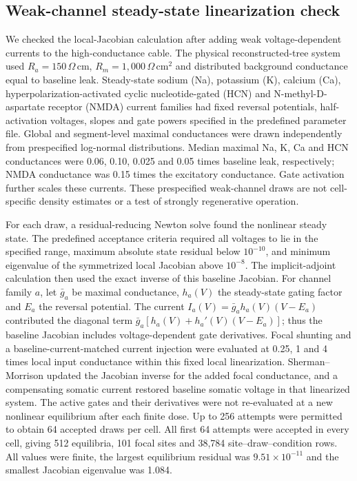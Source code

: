 \subsection{Weak-channel steady-state linearization check}

We checked the local-Jacobian calculation after adding weak
voltage-dependent currents to the high-conductance cable.
The physical reconstructed-tree system used
$R_a=150\,\Omega\,\mathrm{cm}$,
$R_m=1{,}000\,\Omega\,\mathrm{cm}^2$ and distributed background conductance
equal to baseline leak. Steady-state sodium (Na), potassium (K), calcium (Ca),
hyperpolarization-activated cyclic nucleotide-gated (HCN) and
N-methyl-D-aspartate receptor (NMDA) current families had fixed reversal
potentials, half-activation voltages, slopes and gate
powers specified in the predefined parameter file. Global and segment-level
maximal conductances were drawn independently from prespecified log-normal
distributions. Median maximal Na, K, Ca and HCN conductances were 0.06,
0.10, 0.025 and 0.05 times baseline leak, respectively; NMDA conductance was
0.15 times the excitatory conductance. Gate activation further scales these
currents. These prespecified weak-channel draws are not cell-specific
density estimates or a test of strongly regenerative operation.

For each draw, a residual-reducing Newton solve found the nonlinear steady
state. The predefined acceptance criteria required all voltages to lie in the
specified range, maximum absolute state residual below $10^{-10}$, and minimum
eigenvalue of the symmetrized local Jacobian above $10^{-8}$. The implicit-adjoint calculation
then used the exact inverse of this baseline Jacobian. For channel family $a$, let $\bar g_a$ be maximal conductance, $h_a(V)$ the
steady-state gating factor and $E_a$ the reversal potential. The current
$I_a(V)=\bar g_a h_a(V)(V-E_a)$ contributed the diagonal term
$\bar g_a[h_a(V)+h_a'(V)(V-E_a)]$; thus the baseline Jacobian includes
voltage-dependent gate derivatives. Focal shunting and a
baseline-current-matched current injection were evaluated at 0.25, 1 and 4
times local input conductance within this fixed local linearization.
Sherman--Morrison updated the Jacobian inverse for the added focal
conductance, and a compensating somatic current restored baseline somatic
voltage in that linearized system. The active gates and their derivatives
were not re-evaluated at a new nonlinear equilibrium after each finite dose.
Up to 256 attempts were permitted to obtain 64
accepted draws per cell. All first 64 attempts were accepted in every cell,
giving 512 equilibria, 101 focal sites and 38,784 site--draw--condition rows.
All values were finite, the largest equilibrium residual was
$9.51\times10^{-11}$ and the smallest Jacobian eigenvalue was 1.084.

